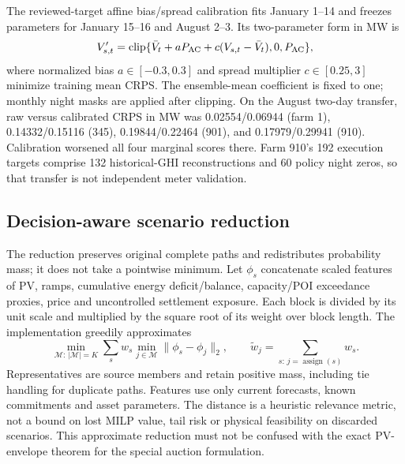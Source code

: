 The reviewed-target affine bias/spread calibration fits January 1--14 and freezes
parameters for January 15--16 and August 2--3. Its two-parameter form in MW is
\begin{equation}
 V'_{s,t}=\operatorname{clip}\{\bar V_t+aP_{\rm AC}+c(V_{s,t}-\bar V_t),0,P_{\rm AC}\},
\end{equation}
where normalized bias $a\in[-0.3,0.3]$ and spread multiplier
$c\in[0.25,3]$ minimize training mean CRPS. The ensemble-mean coefficient
is fixed to one; monthly night masks are applied after clipping.
On the August two-day transfer, raw versus calibrated CRPS in MW was
0.02554/0.06944 (farm 1), 0.14332/0.15116 (345), 0.19844/0.22464 (901), and
0.17979/0.29941 (910). Calibration worsened all four marginal scores there.
Farm 910's 192 execution targets comprise 132 historical-GHI reconstructions
and 60 policy night zeros, so that transfer is not independent meter validation.

\subsection{Decision-aware scenario reduction}
The reduction preserves original complete paths and redistributes probability
mass; it does not take a pointwise minimum. Let $\phi_s$ concatenate scaled
features of PV, ramps, cumulative energy deficit/balance, capacity/POI
exceedance proxies, price and uncontrolled settlement exposure. Each block
is divided by its unit scale and multiplied by the square root of its weight
over block length. The implementation greedily approximates
\begin{equation}
 \min_{\mathcal M:\,|\mathcal M|=K}\sum_sw_s\min_{j\in\mathcal M}
       \|\phi_s-\phi_j\|_2,
 \qquad \tilde w_j=\sum_{s:\,j=\operatorname{assign}(s)}w_s.
\end{equation}
Representatives are source members and retain positive mass, including tie
handling for duplicate paths. Features use only current forecasts, known
commitments and asset parameters. The distance is a heuristic relevance metric,
not a bound on lost MILP value, tail risk or physical feasibility on discarded
scenarios. This approximate reduction must not be confused with the exact
PV-envelope theorem for the special auction formulation.


